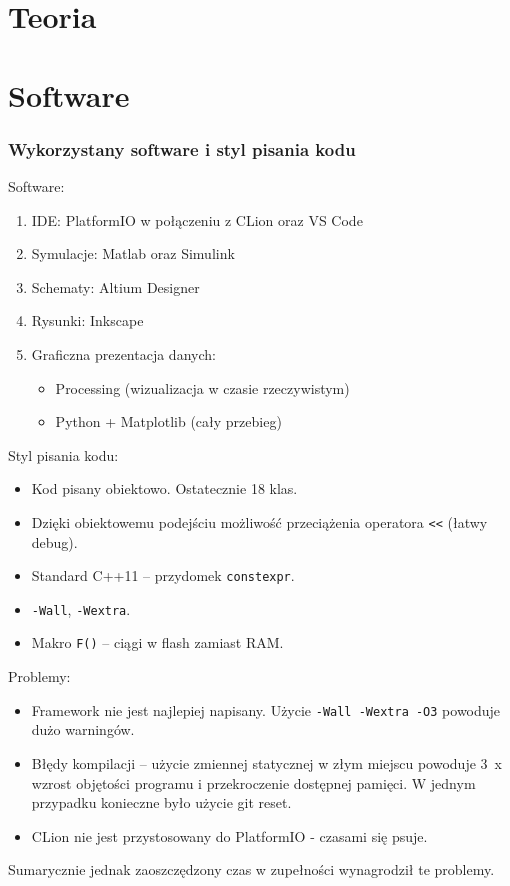 \section{Teoria}

\section{Software}
\begin{frame}
\frametitle{Wykorzystany software i styl pisania kodu}
\tiny
Software:
\begin{enumerate}
\item IDE: PlatformIO w połączeniu z CLion oraz VS Code
\item Symulacje: Matlab oraz Simulink
\item Schematy: Altium Designer
\item Rysunki: Inkscape
\item Graficzna prezentacja danych: 
\begin{itemize}
	\tiny
	\item Processing (wizualizacja w czasie rzeczywistym)
	\item Python + Matplotlib (cały przebieg)
\end{itemize}
\end{enumerate}
Styl pisania kodu:
		\begin{itemize}
			\item Kod pisany obiektowo. Ostatecznie 18 klas.
			\item Dzięki obiektowemu podejściu możliwość przeciążenia operatora \texttt{<<} (łatwy debug).
			\item Standard C++11 -- przydomek \texttt{constexpr}.
			\item \texttt{-Wall}, \texttt{-Wextra}.
			\item Makro \texttt{F()} -- ciągi w flash zamiast RAM.
		\end{itemize}
		Problemy:
		\begin{itemize}
			\item Framework nie jest najlepiej napisany. Użycie \texttt{-Wall -Wextra -O3} powoduje dużo warningów.
			\item Błędy kompilacji -- użycie zmiennej statycznej w złym miejscu powoduje \SI{3}{x} wzrost objętości programu i przekroczenie dostępnej pamięci. W jednym przypadku konieczne było użycie git reset.
			\item CLion nie jest przystosowany do PlatformIO - czasami się psuje.
		\end{itemize}
		Sumarycznie jednak zaoszczędzony czas w zupełności wynagrodził te problemy.
\end{frame}
